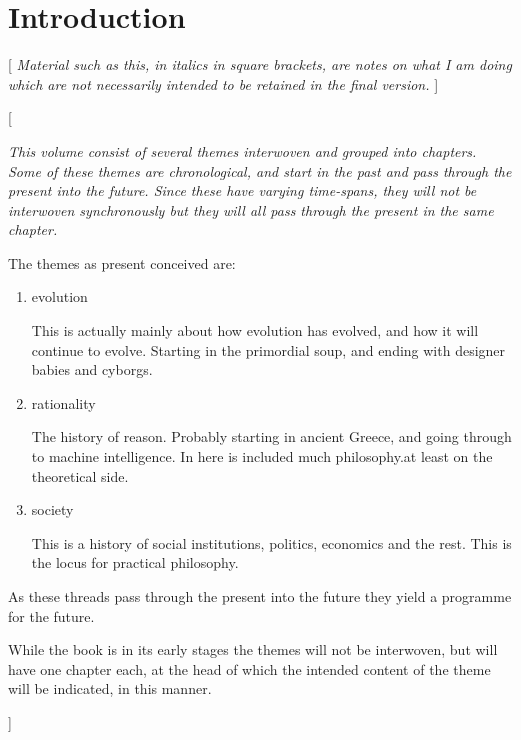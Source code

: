 
\def\wiki#1{#1\index{#1} \footnote{\href{http://wikipedia.org/wiki/#1}{http://wikpedia.org/wiki/#1}}}
\def\Wiki#1{\footnote{\href{http://wikipedia.org/wiki/#1}{http://wikpedia.org/wiki/#1}}}

\chapter{Introduction}

[{\it
Material such as this, in italics in square brackets, are notes on what I am doing which are not necessarily intended to be retained in the final version.
}]

[{\it
This volume consist of several themes interwoven and grouped into chapters.
Some of these themes are chronological, and start in the past and pass through the present into the future.
Since these have varying time-spans, they will not be interwoven synchronously but they will all pass through the present in the same chapter.

The themes as present conceived are:

\begin{enumerate}

\item evolution

This is actually mainly about how evolution has evolved, and how it will continue to evolve.
Starting in the primordial soup, and ending with designer babies and cyborgs.

\item rationality

The history of reason.
Probably starting in ancient Greece, and going through to machine intelligence.
In here is included much philosophy.at least on the theoretical side.

\item society

This is a history of social institutions, politics, economics and the rest.
This is the locus for practical philosophy.

\end{enumerate}

As these threads pass through the present into the future they yield a programme for the future.

While the book is in its early stages the themes will not be interwoven, but will have one chapter each, at the head of which the intended content of the theme will be indicated, in this manner.
}]

